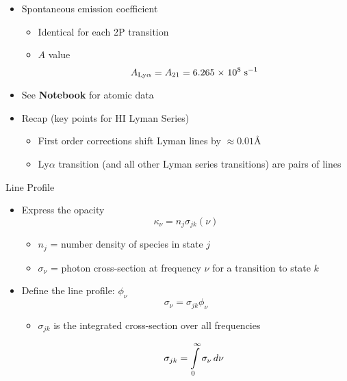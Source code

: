 \documentclass[12pt,letterpaper]{article}
\begin{document}
\begin{Aenumerate}
\begin{itemize}
  \item Spontaneous emission coefficient
    \begin{itemize}
    \item Identical for each 2P transition
    \item $A$ value
      \begin{equation}
      A_{\rm Ly\alpha} = A_{21} = 6.265 {\; \times \; 10^{8}} \; {\rm s^{-1}}
      \end{equation}
    \end{itemize}

 \item See {\bf Notebook} for atomic data

 \item Recap (key points for HI Lyman Series)
   \begin{itemize}
   \item First order corrections shift Lyman lines by $\approx 0.01$\AA
   \item Ly$\alpha$ transition (and all other Lyman series 
   transitions) are pairs of lines
   
   \end{itemize}

 \end{itemize}

{\bf \item Line Profile}

 \begin{itemize}
 \item Express the opacity
   \begin{equation} 
   \kappa_\nu = n_j \sigma_{jk}(\nu)
   \end{equation} 
	\begin{itemize}
	\item $n_j$ = number density of species in state $j$
	\item $\sigma_\nu$ = photon cross-section at frequency $\nu$ for a
		transition to state $k$
	\end{itemize}
 \item Define the line profile: $\phi_\nu$
   \begin{equation}
   \sigma_\nu = \sigma_{jk} \phi_\nu
   \end{equation}
	\begin{itemize}
	\item $\sigma_{jk}$ is the integrated cross-section over all frequencies

	\begin{equation}
	 \sigma_{jk} = \int\limits_0^\infty \sigma_\nu \, d\nu
	\end{equation}


\end{itemize}
\end{itemize}
\end{Aenumerate}
\end{document}
